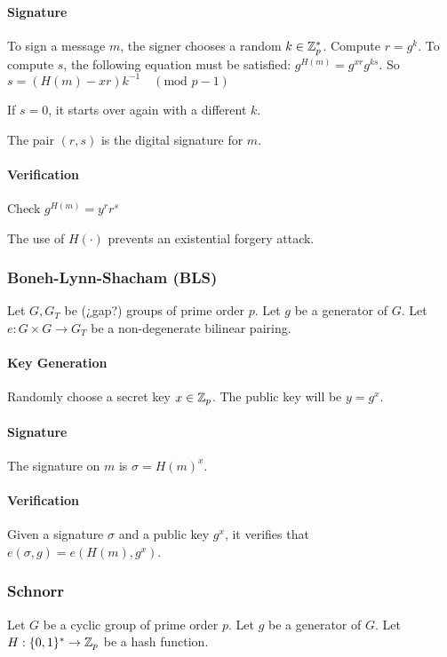 \paragraph{Signature}

To sign a message $m$, the signer chooses a random $k \in {\mathbb Z}_p^\ast$.
Compute $ r = g^k$. To compute $s$, the following equation must be satisfied: $g^{H(m)} = g^{xr} g^{ks}$.
So $s = \left( H(m) - xr \right) k^{-1} \quad (\text{mod } p-1)$

If $s=0$, it starts over again with a different $k$.

The pair $(r,s)$ is the digital signature for $m$.

\paragraph{Verification}

Check $g^{H(m)} = y^r r^s$

The use of $H( \cdot )$ prevents an existential forgery attack.

\subsubsection{Boneh-Lynn-Shacham (BLS)}
\cite{BonehLS01}
Let $G,G_T$ be (¿gap?) groups of prime order $p$. Let $g$ be a generator of $G$. Let $e:G \times G \rightarrow G_T$ be a non-degenerate bilinear pairing.
\paragraph{Key Generation}

Randomly choose a secret key $x \in {\mathbb Z}_p$. The public key will be $y = g^x$.

\paragraph{Signature}

The signature on $m$ is $\sigma = H(m)^x$.

\paragraph{Verification}

Given a signature $\sigma$ and a public key $g^x$, it verifies that $e(\sigma,g) = e \left( H(m), g^x \right)$.

\subsubsection{Schnorr}
\cite{Schnorr90}
Let $G$ be a cyclic group of prime order $p$. Let $g$ be a generator of $G$. Let $H : \{0,1\}^\ast \rightarrow {\mathbb Z}_p$ be a hash function.
